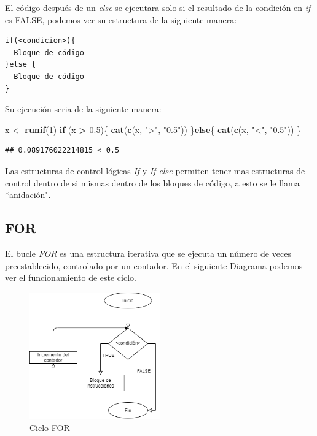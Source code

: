\documentclass[11pt,]{article}
\newenvironment{Shaded}{\begin{snugshade}}{\end{snugshade}}
\newcommand{\ControlFlowTok}[1]{\textcolor[rgb]{0.13,0.29,0.53}{\textbf{#1}}}
\newcommand{\DecValTok}[1]{\textcolor[rgb]{0.00,0.00,0.81}{#1}}
\newcommand{\FloatTok}[1]{\textcolor[rgb]{0.00,0.00,0.81}{#1}}
\newcommand{\KeywordTok}[1]{\textcolor[rgb]{0.13,0.29,0.53}{\textbf{#1}}}
\newcommand{\NormalTok}[1]{#1}
\newcommand{\OperatorTok}[1]{\textcolor[rgb]{0.81,0.36,0.00}{\textbf{#1}}}
\newcommand{\StringTok}[1]{\textcolor[rgb]{0.31,0.60,0.02}{#1}}
\begin{document}
El código después de un \emph{else} se ejecutara solo si el resultado de
la condición en \emph{if} es FALSE, podemos ver su estructura de la
siguiente manera:

\begin{verbatim}
if(<condicion>){
  Bloque de código
}else {
  Bloque de código
}
\end{verbatim}

Su ejecución seria de la siguiente manera:

\begin{Shaded}
\begin{Highlighting}[]
\NormalTok{x <-}\StringTok{ }\KeywordTok{runif}\NormalTok{(}\DecValTok{1}\NormalTok{)}
\ControlFlowTok{if}\NormalTok{ (x }\OperatorTok{>}\StringTok{ }\FloatTok{0.5}\NormalTok{)\{}
  \KeywordTok{cat}\NormalTok{(}\KeywordTok{c}\NormalTok{(x, }\StringTok{">"}\NormalTok{, }\StringTok{"0.5"}\NormalTok{))}
\NormalTok{\}}\ControlFlowTok{else}\NormalTok{\{}
  \KeywordTok{cat}\NormalTok{(}\KeywordTok{c}\NormalTok{(x, }\StringTok{"<"}\NormalTok{, }\StringTok{"0.5"}\NormalTok{))}
\NormalTok{\}}
\end{Highlighting}
\end{Shaded}

\begin{verbatim}
## 0.089176022214815 < 0.5
\end{verbatim}

Las estructuras de control lógicas \emph{If} y \emph{If-else} permiten
tener mas estructuras de control dentro de si mismas dentro de los
bloques de código, a esto se le llama *anidación".

\hypertarget{for}{%
\subsection{FOR}\label{for}}

El bucle \emph{FOR} es una estructura iterativa que se ejecuta un número
de veces preestablecido, controlado por un contador. En el siguiente
Diagrama podemos ver el funcionamiento de este ciclo.

\begin{figure}
\hypertarget{id}{%
\centering
\includegraphics[width=0.5\textwidth,height=0.3\textheight]{../schemas/FOR.png}
\caption{Ciclo FOR}\label{id}
}
\end{figure}
\end{document}
